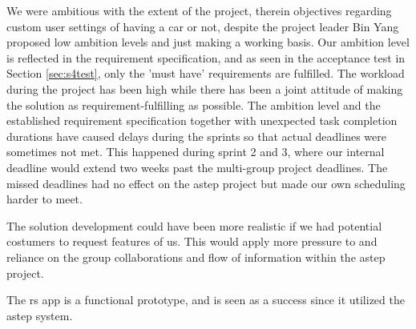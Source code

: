 We were ambitious with the extent of the project, therein objectives regarding custom user settings of having a car or not, despite the project leader Bin Yang proposed low ambition levels and just making a working basis.
Our ambition level is reflected in the requirement specification, and as seen in the acceptance test in Section \ref{sec:s4test}, only the 'must have' requirements are fulfilled.
The workload during the project has been high while there has been a joint attitude of making the solution as requirement-fulfilling as possible.
The ambition level and the established requirement specification together with unexpected task completion durations have caused delays during the sprints so that actual deadlines were sometimes not met.
This happened during sprint 2 and 3, where our internal deadline would extend two weeks past the multi-group project deadlines.
The missed deadlines had no effect on the \gls{astep} project but made our own scheduling harder to meet.

The solution development could have been more realistic if we had potential costumers to request features of us.
This would apply more pressure to and reliance on the group collaborations and flow of information within the \gls{astep} project.

The \gls{rs} app is a functional prototype, and is seen as a success since it utilized the \gls{astep} system.


